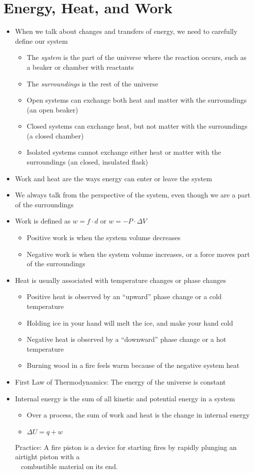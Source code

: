 \documentclass[12pt, openany, letterpaper]{memoir}
\begin{document}
\section{Energy, Heat, and Work}
\begin{itemize}
	\item When we talk about changes and transfers of energy, we need to carefully define our system
	\begin{itemize}
		\item The \emph{system} is the part of the universe where the reaction occurs, such as a beaker or chamber with reactants
		\item The \emph{surroundings} is the rest of the universe
		\item Open systems can exchange both heat and matter with the surroundings (an open beaker)
		\item Closed systems can exchange heat, but not matter with the surroundings (a closed chamber)
		\item Isolated systems cannot exchange either heat or matter with the surroundings (an closed, insulated flask)
	\end{itemize}
	\item Work and heat are the ways energy can enter or leave the system
	\item We always talk from the perspective of the system, even though we are a part of the surroundings
	\item Work is defined as $w=f\cdot d$ or $w=-P\cdot\Delta V$
	\begin{itemize}
		\item Positive work is when the system volume decreases
		\item Negative work is when the system volume increases, or a force moves part of the surroundings
	\end{itemize}
	\item Heat is usually associated with temperature changes or phase changes
	\begin{itemize}
		\item Positive heat is observed by an “upward” phase change or a cold temperature
		\item Holding ice in your hand will melt the ice, and make your hand cold
		\item Negative heat is observed by a “downward” phase change or a hot temperature
		\item Burning wood in a fire feels warm because of the negative system heat
	\end{itemize}
	\item First Law of Thermodynamics: The energy of the universe is constant
	\item Internal energy is the sum of all kinetic and potential energy in a system
	\begin{itemize}
		\item Over a process, the sum of work and heat is the change in internal energy
		\item $\Delta U=q+w$
	\end{itemize}
	Practice: A fire piston is a device for starting fires by rapidly plunging an airtight piston with a\\
	~\hphantom{Practice: } combustible material on its end.
	

\end{itemize}
\end{document}
